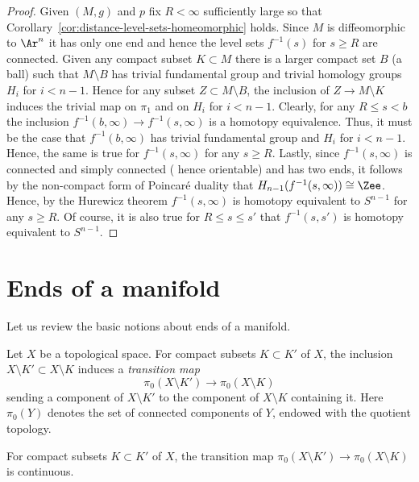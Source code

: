 \begin{proof}
Given $(M,g)$ and $p$ fix $R<\infty$ sufficiently large so that
Corollary~\ref{cor:distance-level-sets-homeomorphic} holds. Since $M$ is diffeomorphic to $\Ar^n$
it has only one end and hence the level sets $f^{-1}(s)$ for $s\ge
R$ are connected. Given any compact subset $K\subset M$ there is a
larger compact set $B$ (a ball) such that $M\setminus B$ has trivial
fundamental group and trivial homology groups $H_i$ for $i<n-1$.
Hence for any subset $Z\subset M\setminus B$, the inclusion of $Z\to
M\setminus K$ induces the trivial map on $\pi_1$ and on $H_i$ for
$i<n-1$. Clearly, for any $R\le s<b$ the inclusion
$f^{-1}(b,\infty)\to f^{-1}(s,\infty)$ is a homotopy equivalence.
Thus, it must be the case that $f^{-1}(b,\infty)$ has trivial
fundamental group and $H_i$ for $i<n-1$. Hence, the same is true for
$f^{-1}(s,\infty)$ for any $s\ge R$. Lastly, since
$f^{-1}(s,\infty)$ is connected and simply connected ( hence
orientable) and has two ends, it follows by the non-compact form of
Poincar\'e duality that $H_{n-1}(f^{-1}(s,\infty))\cong \Zee$.
Hence, by the Hurewicz theorem $f^{-1}(s,\infty)$ is homotopy
equivalent to $S^{n-1}$ for any $s\ge R$. Of course, it is also true
for $R\le s\le s'$ that $f^{-1}(s,s')$ is homotopy equivalent to
$S^{n-1}$.
\end{proof}

\section{Ends of a manifold}
\label{ENDS}

Let us review the basic notions about ends of a manifold.


\begin{definition}
\label{def:ends-transition}
\leanok
{}
Let $X$ be a topological space. For compact subsets $K\subset K'$ of
$X$, the inclusion $X\setminus K'\subset X\setminus K$ induces a
{\em transition map}
$$\pi_0(X\setminus K')\longrightarrow \pi_0(X\setminus K)$$
sending a component of $X\setminus K'$ to the component of
$X\setminus K$ containing it. Here $\pi_0(Y)$ denotes the set of
connected components of $Y$, endowed with the quotient topology.
\end{definition}

\begin{lemma}
\label{lem:ends-transition-continuous}
\leanok
{}
For compact subsets $K\subset K'$ of $X$, the transition map
$\pi_0(X\setminus K')\to\pi_0(X\setminus K)$ is continuous.
\end{lemma}

